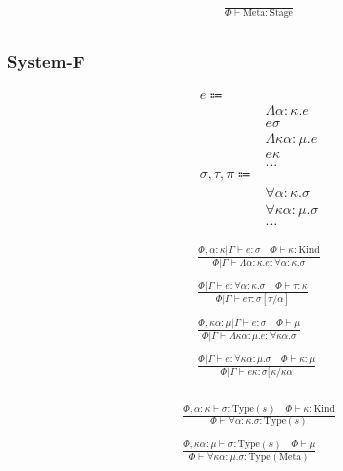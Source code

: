 \documentclass {article}
\begin{document}
\begin{gather*}
\frac
{}
{\Phi \vdash \text{Meta} : \text{Stage}} \\
\end{gather*}

\subsubsection{System-F}
\begin{align*}
e \Coloneqq & \\
& \Lambda \alpha : \kappa. e \tag{Type Lambda} \\
& e \sigma \tag{Type Application} \\
& \Lambda \kappa \alpha : \mu. e \tag{Kind Lambda} \\
& e \kappa \tag{Kind Application} \\
& \dots \\
\sigma, \tau, \pi \Coloneqq & \\
& \forall \alpha : \kappa. \sigma \tag{Type Forall}\\ 
& \forall \kappa \alpha : \mu. \sigma \tag{Kind Forall}\\
& \dots
\end{align*}

\begin{gather*}
\frac
{\Phi, \alpha : \kappa | \Gamma \vdash e : \sigma \quad \Phi \vdash \kappa : \text{Kind}}
{\Phi | \Gamma \vdash \Lambda \alpha : \kappa. e : \forall \alpha : \kappa. \sigma } \\
\\
\frac
{\Phi | \Gamma \vdash e : \forall \alpha : \kappa. \sigma \quad \Phi \vdash \tau : \kappa }
{\Phi | \Gamma \vdash e \tau : \sigma [\tau/\alpha] } \\
\\
\frac
{\Phi, \kappa \alpha : \mu | \Gamma \vdash e : \sigma \quad \Phi \vdash \mu}
{\Phi | \Gamma \vdash \Lambda \kappa \alpha : \mu. e : \forall \kappa \alpha. \sigma} \\
\\
\frac
{\Phi | \Gamma \vdash e : \forall \kappa \alpha : \mu. \sigma \quad \Phi \vdash \kappa : \mu}
{\Phi | \Gamma \vdash e \kappa : \sigma [\kappa/\kappa \alpha} \\
\end{gather*}

\begin{gather*}
\frac
{\Phi, \alpha : \kappa \vdash \sigma : \text{Type}(s) \quad \Phi \vdash \kappa : \text{Kind}}
{\Phi \vdash \forall \alpha : \kappa. \sigma : \text{Type} (s) } \\
\\
\frac
{\Phi, \kappa \alpha : \mu \vdash \sigma : \text{Type} (s) \quad \Phi \vdash \mu  }
{\Phi \vdash \forall \kappa \alpha : \mu. \sigma : \text{Type} (\text{Meta}) } \\
\end{gather*}
\end{document}
